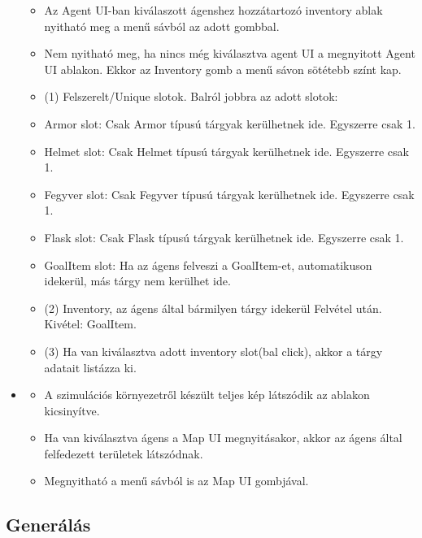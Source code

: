 \begin{itemize}
    \begin{itemize}
        \item Az Agent UI-ban kiválaszott ágenshez hozzátartozó inventory ablak nyitható meg a menű sávból az adott gombbal.
        \item Nem nyitható meg, ha nincs még kiválasztva agent UI a megnyitott Agent UI ablakon. Ekkor az Inventory gomb a menű sávon sötétebb színt kap.
        \item (1) Felszerelt/Unique slotok. Balról jobbra az adott slotok:
        \item Armor slot: Csak Armor típusú tárgyak kerülhetnek ide. Egyszerre csak 1.
        \item Helmet slot: Csak Helmet típusú tárgyak kerülhetnek ide. Egyszerre csak 1.
        \item Fegyver slot: Csak Fegyver típusú tárgyak kerülhetnek ide. Egyszerre csak 1.
        \item Flask slot: Csak Flask típusú tárgyak kerülhetnek ide. Egyszerre csak 1.
        \item GoalItem slot: Ha az ágens felveszi a GoalItem-et, automatikuson idekerül, más tárgy nem kerülhet ide.
        \item (2) Inventory, az ágens által bármilyen tárgy idekerül Felvétel után. Kivétel: GoalItem.
        \item (3) Ha van kiválasztva adott inventory slot(bal click), akkor a tárgy adatait listázza ki.
    \end{itemize}

    \item {}
    
    \begin{itemize}
        \item A szimulációs környezetről készült teljes kép látszódik az ablakon kicsinyítve.
        \item Ha van kiválasztva ágens a Map UI megnyitásakor, akkor az ágens által felfedezett területek látszódnak.
        \item Megnyitható a menű sávból is az Map UI gombjával.
    \end{itemize}

\end{itemize}


\subsection{Generálás}

